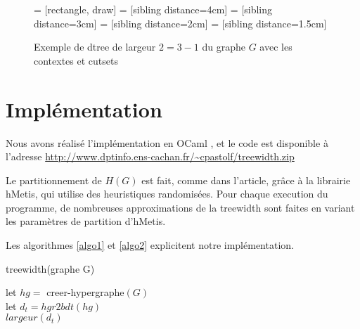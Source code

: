 \documentclass{article}
\begin{document}
\begin{figure}[H]
   = [rectangle, draw]
   = [sibling distance=4cm]
   = [sibling distance=3cm]
   = [sibling distance=2cm]
   = [sibling distance=1.5cm]
  \centering
 \caption{Exemple de dtree de largeur $2=3-1$ du graphe $G$ avec les contextes et cutsets}
\label{lol3}
\end{figure}

\newpage

\section{Implémentation}
Nous avons réalisé l'implémentation en OCaml \cite{ocaml}, et le code
est disponible à l'adresse
\url{http://www.dptinfo.ens-cachan.fr/~cpastolf/treewidth.zip}

Le partitionnement de $H(G)$ est fait, comme dans l'article, grâce à
la librairie hMetis, qui utilise des heuristiques randomisées.
Pour chaque execution du programme, de nombreuses approximations de la
treewidth sont faites en variant les paramètres de partition d'hMetis.

Les algorithmes \ref{algo1} et \ref{algo2} explicitent notre implémentation.


\begin{algorithm}
  \caption{treewidth(graphe G)}
  \begin{algorithmic}
    \STATE let $hg =$ \mbox{creer-hypergraphe}$(G)$\\
    \STATE let $d_t = hgr2bdt(hg)$\\
    \RETURN $largeur(d_t)$\\
  \end{algorithmic}
  \label{algo1}
\end{algorithm}
\end{document}
